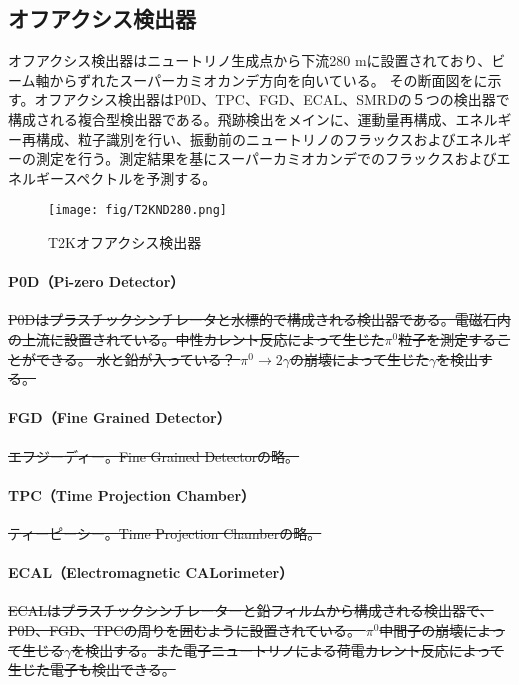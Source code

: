 \subsection{オフアクシス検出器}
オフアクシス検出器はニュートリノ生成点から下流280 mに設置されており、ビーム軸からずれたスーパーカミオカンデ方向を向いている。
その断面図をに示す。オフアクシス検出器はP0D、TPC、FGD、ECAL、SMRDの５つの検出器で構成される複合型検出器である。飛跡検出をメインに、運動量再構成、エネルギー再構成、粒子識別を行い、振動前のニュートリノのフラックスおよびエネルギーの測定を行う。測定結果を基にスーパーカミオカンデでのフラックスおよびエネルギースペクトルを予測する。

\begin{figure}[htbp]
\centering
\texttt{[image: fig/T2KND280.png]}
\caption[T2Kオフアクシス検出器]{T2Kオフアクシス検出器}
\label{TOAD}
\end{figure}

\paragraph{P0D（Pi-zero Detector）}
\sout{P0Dはプラスチックシンチレータと水標的で構成される検出器である。電磁石内の上流に設置されている。中性カレント反応によって生じた$\pi^{0}$粒子を測定することができる。
水と鉛が入っている？
%
$\pi^{0} \rightarrow 2 \gamma$の崩壊によって生じた$\gamma$を検出する。}

\paragraph{FGD（Fine Grained Detector）}
\sout{エフジーディー。Fine Grained Detectorの略。}

\paragraph{TPC（Time Projection Chamber）}
\sout{ティーピーシー。Time Projection Chamberの略。}

\paragraph{ECAL（Electromagnetic CALorimeter）}
\sout{ECALはプラスチックシンチレーターと鉛フィルムから構成される検出器で、P0D、FGD、TPCの周りを囲むように設置されている。
$\pi^{0}$中間子の崩壊によって生じる$\gamma$を検出する。また電子ニュートリノによる荷電カレント反応によって生じた電子も検出できる。}

